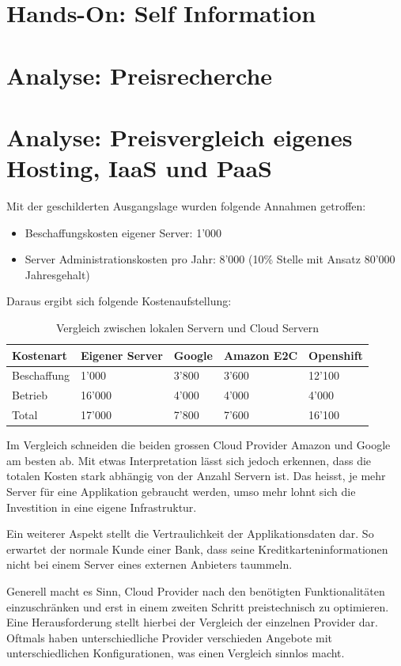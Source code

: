 \documentclass[12pt,a4paper]{article}
\begin{document}
\section{Hands-On: Self Information}


\section{Analyse: Preisrecherche}

\section{Analyse: Preisvergleich eigenes Hosting, IaaS und PaaS}

Mit der geschilderten Ausgangslage wurden folgende Annahmen getroffen:

\begin{itemize}
	\item Beschaffungskosten eigener Server: 1'000
	\item Server Administrationskosten pro Jahr: 8'000 (10\% Stelle mit Ansatz 80'000 Jahresgehalt)
\end{itemize}

Daraus ergibt sich folgende Kostenaufstellung:

\begin{table}[H]
    \begin{tabular}{| l | l | l | l | l |}
		\hline
        Kostenart & Eigener Server & Google & Amazon E2C & Openshift \\ \hline
        Beschaffung & 1'000 & 3'800 & 3'600 & 12'100\\
        Betrieb & 16'000 & 4'000 & 4'000 & 4'000\\
        Total & 17'000 & 7'800 & 7'600 & 16'100 \\ \hline
    \end{tabular}
    \caption{Vergleich zwischen lokalen Servern und Cloud Servern}
\end{table}

Im Vergleich schneiden die beiden grossen Cloud Provider Amazon und Google am besten ab. Mit etwas Interpretation lässt sich jedoch erkennen, dass die totalen Kosten stark abhängig von der Anzahl Servern ist.
Das heisst, je mehr Server für eine Applikation gebraucht werden, umso mehr lohnt sich die Investition in eine eigene Infrastruktur.

Ein weiterer Aspekt stellt die Vertraulichkeit der Applikationsdaten dar. So erwartet der normale Kunde einer Bank, dass seine Kreditkarteninformationen nicht bei einem Server eines externen Anbieters taummeln.

Generell macht es Sinn, Cloud Provider nach den benötigten Funktionalitäten einzuschränken und erst in einem zweiten Schritt preistechnisch zu optimieren. Eine Herausforderung stellt hierbei der Vergleich der einzelnen Provider dar.
Oftmals haben unterschiedliche Provider verschieden Angebote mit unterschiedlichen Konfigurationen, was einen Vergleich sinnlos macht.
\end{document}
